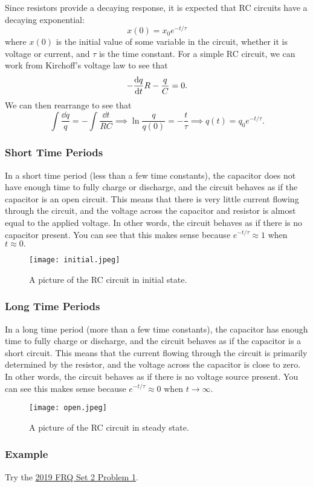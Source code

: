 \documentclass[12pt]{article}
\begin{document}
Since resistors provide a decaying response, it is expected that RC circuits have a decaying exponential:
\[x(0) = x_0 e^{-t/\tau}\]
where $x(0)$ is the initial value of some variable in the circuit, whether it is voltage or current, and $\tau$ is the time constant. For a simple RC circuit, we can work from Kirchoff's voltage law to see that 
\[-\dv{q}{t}R - \frac{q}{C} = 0.\]
We can then rearrange to see that 
\[\int \frac{\dd q}{q} = - \int \frac{\dd t}{RC}\implies \ln \frac{q}{q(0)} = -\frac{t}{\tau} \implies q(t) = q_0 e^{-t/\tau}.\]
\subsubsection{Short Time Periods}
In a short time period (less than a few time constants), the capacitor does not have enough time to fully charge or discharge, and the circuit behaves as if the capacitor is an open circuit. This means that there is very little current flowing through the circuit, and the voltage across the capacitor and resistor is almost equal to the applied voltage. In other words, the circuit behaves as if there is no capacitor present. You can see that this makes sense because $e^{-t/\tau} \approx 1$ when $t \approx 0.$
\begin{figure}[H]
  \centering
      \texttt{[image: initial.jpeg]}
      \caption{A picture of the RC circuit in initial state.}
  \end{figure}
\subsubsection{Long Time Periods}
In a long time period (more than a few time constants), the capacitor has enough time to fully charge or discharge, and the circuit behaves as if the capacitor is a short circuit. This means that the current flowing through the circuit is primarily determined by the resistor, and the voltage across the capacitor is close to zero. In other words, the circuit behaves as if there is no voltage source present. You can see this makes sense because $e^{-t/\tau} \approx 0$ when $t\to \infty$.
\begin{figure}[H]
  \centering
      \texttt{[image: open.jpeg]}
      \caption{A picture of the RC circuit in steady state.}
  \end{figure}
\subsubsection{Example}
Try the \href{https://apcentral.collegeboard.org/media/pdf/ap19-frq-physics-c-em-set-2.pdf}{2019 FRQ Set 2 Problem 1}.
\newpage 
\end{document}
